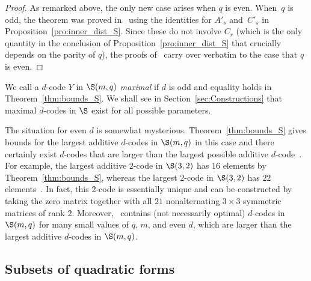 \begin{proof}
As remarked above, the only new case arises when $q$ is even. When~$q$ is odd, the theorem was proved in~\cite[Lemmas~3.5 and~3.6]{Sch2015} using the identities for $A'_s$ and~$C'_s$ in Proposition~\ref{pro:inner_dist_S}. Since these do not involve $C_r$ (which is the only quantity in the conclusion of Proposition~\ref{pro:inner_dist_S} that crucially depends on the parity of $q$), the proofs of~\cite[Lemmas~3.5 and~3.6]{Sch2015} carry over verbatim to the case that $q$ is even.
\end{proof}
\par
We call a $d$-code $Y$ in $\S(m,q)$ \emph{maximal} if $d$ is odd and equality holds in Theorem~\ref{thm:bounds_S}. We shall see in Section~\ref{sec:Constructions} that maximal $d$-codes in $\S$ exist for all possible parameters. 
\par
The situation for even $d$ is somewhat mysterious. Theorem~\ref{thm:bounds_S} gives bounds for the largest additive $d$-codes in $\S(m,q)$ in this case and there certainly exist $d$-codes that are larger than the largest possible additive $d$-code~\cite{Sch2016}. For example, the largest additive $2$-code in $\S(3,2)$ has $16$ elements by Theorem~\ref{thm:bounds_S}, whereas the largest $2$-code in $\S(3,2)$ has $22$ elements~\cite{Sch2016}. In fact, this $2$-code is essentially unique and can be constructed by taking the zero matrix together with all $21$ nonalternating $3\times 3$ symmetric matrices of rank $2$. Moreover,~\cite{Sch2016} contains (not necessarily optimal) $d$-codes in $\S(m,q)$ for many small values of $q$, $m$, and even $d$, which are larger than the largest additive $d$-codes in $\S(m,q)$.

%

\subsection{Subsets of quadratic forms}


